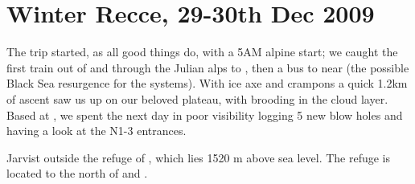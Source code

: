 \section{Winter Recce, 29-30th Dec 2009}

The trip started, as all good things do, with a 5AM alpine start; we caught the first train out of  and through the Julian alps to , then a bus to  near  (the possible Black Sea resurgence for the  systems). With ice axe and crampons a quick 1.2km of ascent saw us up on our beloved plateau, with  brooding in the cloud layer. Based at , we spent the next day in poor visibility logging 5 new blow holes and having a look at the N1-3 entrances.



\begin{pagefigure}
\checkoddpage \ifoddpage \forcerectofloat \else \forceversofloat \fi
{}
\caption{Jarvist outside the refuge of , which lies 1520 m above sea level. The refuge is located to the north of  and . } \label{Dom na Komni in snow}
\end{pagefigure}




